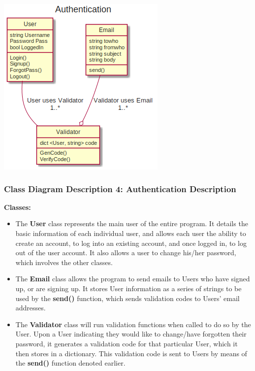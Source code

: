 \documentclass[twoside,letterpaper]{article}
\begin{document}
{\includegraphics[width=\textwidth]{images/ClassDiagrams/Authentication}

\newpage

\subsubsection[Class Diagram Description 4: Authentication Description]{\rmfamily\bfseries\color{black}
	Class Diagram Description 4: Authentication Description}
\hypertarget{RefHeading22059017292}{}

\textbf{Classes:}
\begin{itemize}

	\item The \textbf{User} class represents the main user of the entire program. It details the basic information of each individual user, and allows each user the ability to create an account, to log into an existing account, and once logged in, to log out of the user account. It also allows a user to change his/her password, which involves the other classes.
	\item The \textbf{Email} class allows the program to send emails to Users who have signed up, or are signing up. It stores User information as a series of strings to be used by the \textbf{send()} function, which sends validation codes to Users' email addresses.
	\item The \textbf{Validator} class will run validation functions when called to do so by the User. Upon a User indicating they would like to change/have forgotten their password, it generates a validation code for that particular User, which it then stores in a dictionary. This validation code is sent to Users by means of the \textbf{send()} function denoted earlier.
\end{itemize}

}
\end{document}
